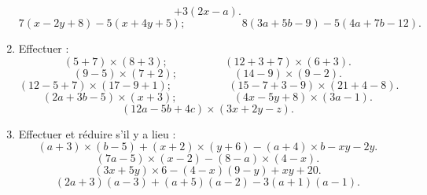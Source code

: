 \documentclass[12 pt]{extarticle}
\theoremstyle{plain}
\begin{document}
\begin{enumerate}
\[+ 3(2x -a).\]
\[7(x - 2y + 8) - 5(x + 4y + 5); \phantom{meowmeow} 8(3a + 5b - 9)
- 5(4a + 7b - 12). \]
\item Effectuer :
\[ (5 + 7)\times(8 + 3); \phantom{meowmeow} (12 + 3 + 7) \times (6 + 3).\]
\[ (9 - 5) \times (7 + 2) ; \phantom{meowmeow} (14 - 9)\times (9 - 2).\]
\[ (12 - 5 + 7) \times (17 - 9 + 1) ; \phantom{meowmeow} (15 - 7 + 3 - 9) \times (21 + 4 - 8). \]
\[ (2a + 3b - 5) \times (x + 3); \phantom{meowmeow} (4x - 5y + 8) \times (3a -1).\]
\[ (12a - 5b + 4c) \times (3x + 2y - z).\]
\item Effectuer et réduire s'il y a lieu : 
\[ (a + 3)\times(b -5)+ (x + 2)\times(y + 6) - (a + 4)\times b - xy - 2y.\]
\[(7a - 5)\times(x - 2) - (8 - a)\times(4 - x).\]
\[(3x + 5y)\times 6 - (4 - x)(9 - y) + xy + 20.\]
\[ (2a + 3)(a - 3) + (a + 5)(a - 2) - 3(a + 1)(a - 1).\]
 \end{enumerate}
 
\end{document}
